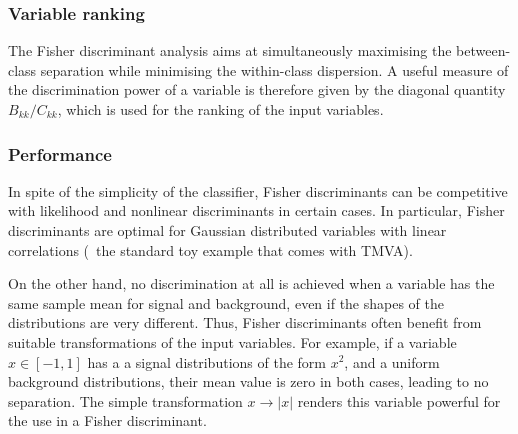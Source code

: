 \subsubsection{Variable ranking}

The Fisher discriminant analysis aims at simultaneously maximising the 
between-class separation while minimising the within-class dispersion. 
A useful measure of the discrimination power of a variable is therefore
given by the diagonal quantity $B_{kk}/C_{kk}$, which is used for the 
ranking of the input variables.

\subsubsection{Performance}

In spite of the simplicity of the classifier, Fisher discriminants can 
be competitive with likelihood and nonlinear discriminants
in certain cases. In particular, Fisher discriminants are 
optimal for Gaussian distributed variables with linear correlations
(\cf\  the standard toy example that comes with TMVA). 

On the other hand, no discrimination at all is achieved when a variable 
has the same sample mean for signal and background, even if the shapes
of the distributions are very different. Thus, Fisher discriminants 
often benefit from suitable transformations 
of the input variables. For example, if a variable $x\in[-1,1]$ has a 
a signal distributions of the form $x^2$, and a uniform background
distributions, their mean value is zero in both cases, leading to no 
separation. The simple transformation $x\to |x|$ renders this variable 
powerful for the use in a Fisher discriminant.
